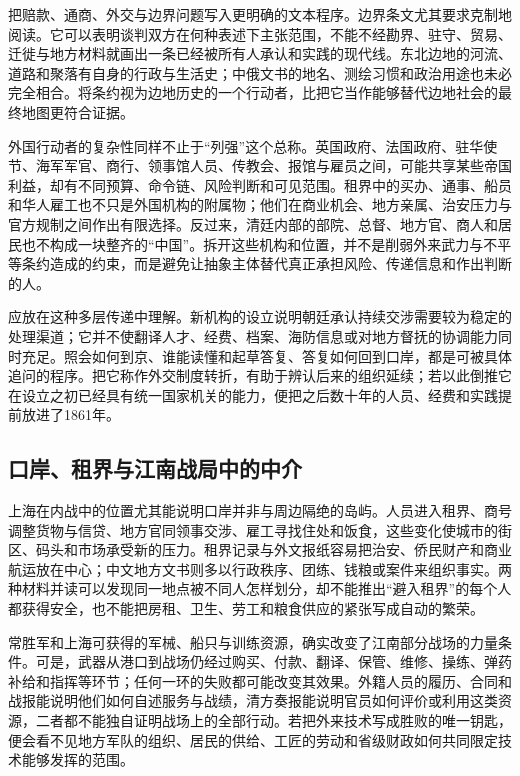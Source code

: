 把赔款、通商、外交与边界问题写入更明确的文本程序。边界条文尤其要求克制地阅读。它可以表明谈判双方在何种表述下主张范围，不能不经勘界、驻守、贸易、迁徙与地方材料就画出一条已经被所有人承认和实践的现代线。东北边地的河流、道路和聚落有自身的行政与生活史；中俄文书的地名、测绘习惯和政治用途也未必完全相合。将条约视为边地历史的一个行动者，比把它当作能够替代边地社会的最终地图更符合证据。

外国行动者的复杂性同样不止于“列强”这个总称。英国政府、法国政府、驻华使节、海军军官、商行、领事馆人员、传教会、报馆与雇员之间，可能共享某些帝国利益，却有不同预算、命令链、风险判断和可见范围。租界中的买办、通事、船员和华人雇工也不只是外国机构的附属物；他们在商业机会、地方亲属、治安压力与官方规制之间作出有限选择。反过来，清廷内部的部院、总督、地方官、商人和居民也不构成一块整齐的“中国”。拆开这些机构和位置，并不是削弱外来武力与不平等条约造成的约束，而是避免让抽象主体替代真正承担风险、传递信息和作出判断的人。

应放在这种多层传递中理解。新机构的设立说明朝廷承认持续交涉需要较为稳定的处理渠道；它并不使翻译人才、经费、档案、海防信息或对地方督抚的协调能力同时充足。照会如何到京、谁能读懂和起草答复、答复如何回到口岸，都是可被具体追问的程序。把它称作外交制度转折，有助于辨认后来的组织延续；若以此倒推它在设立之初已经具有统一国家机关的能力，便把之后数十年的人员、经费和实践提前放进了1861年。

\subsection{口岸、租界与江南战局中的中介}

上海在内战中的位置尤其能说明口岸并非与周边隔绝的岛屿。人员进入租界、商号调整货物与信贷、地方官同领事交涉、雇工寻找住处和饭食，这些变化使城市的街区、码头和市场承受新的压力。租界记录与外文报纸容易把治安、侨民财产和商业航运放在中心；中文地方文书则多以行政秩序、团练、钱粮或案件来组织事实。两种材料并读可以发现同一地点被不同人怎样划分，却不能推出“避入租界”的每个人都获得安全，也不能把房租、卫生、劳工和粮食供应的紧张写成自动的繁荣。

常胜军和上海可获得的军械、船只与训练资源，确实改变了江南部分战场的力量条件。可是，武器从港口到战场仍经过购买、付款、翻译、保管、维修、操练、弹药补给和指挥等环节；任何一环的失败都可能改变其效果。外籍人员的履历、合同和战报能说明他们如何自述服务与战绩，清方奏报能说明官员如何评价或利用这类资源，二者都不能独自证明战场上的全部行动。若把外来技术写成胜败的唯一钥匙，便会看不见地方军队的组织、居民的供给、工匠的劳动和省级财政如何共同限定技术能够发挥的范围。


